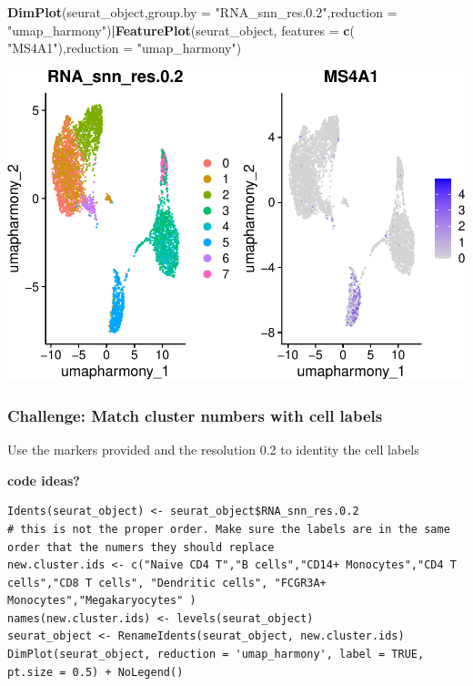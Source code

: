 \documentclass[
]{book}
\newenvironment{Shaded}{\begin{snugshade}}{\end{snugshade}}
\newcommand{\AttributeTok}[1]{\textcolor[rgb]{0.13,0.29,0.53}{#1}}
\newcommand{\FunctionTok}[1]{\textcolor[rgb]{0.13,0.29,0.53}{\textbf{#1}}}
\newcommand{\NormalTok}[1]{#1}
\newcommand{\SpecialCharTok}[1]{\textcolor[rgb]{0.81,0.36,0.00}{\textbf{#1}}}
\newcommand{\StringTok}[1]{\textcolor[rgb]{0.31,0.60,0.02}{#1}}
\begin{document}
\begin{Shaded}
\begin{Highlighting}[]


\FunctionTok{DimPlot}\NormalTok{(seurat\_object,}\AttributeTok{group.by =} \StringTok{"RNA\_snn\_res.0.2"}\NormalTok{,}\AttributeTok{reduction =} \StringTok{"umap\_harmony"}\NormalTok{)}\SpecialCharTok{|}\FunctionTok{FeaturePlot}\NormalTok{(seurat\_object, }\AttributeTok{features =} \FunctionTok{c}\NormalTok{( }\StringTok{"MS4A1"}\NormalTok{),}\AttributeTok{reduction =} \StringTok{"umap\_harmony"}\NormalTok{)}
\end{Highlighting}
\end{Shaded}

\includegraphics{scRNAseqInR_ABACBS_2024_Doco_files/figure-latex/labelplot-1.pdf}

\hypertarget{challenge-match-cluster-numbers-with-cell-labels}{%
\subsubsection*{Challenge: Match cluster numbers with cell labels}\label{challenge-match-cluster-numbers-with-cell-labels}}

Use the markers provided and the resolution 0.2 to identity the cell labels

\textbf{code ideas?}

\begin{verbatim}
Idents(seurat_object) <- seurat_object$RNA_snn_res.0.2
# this is not the proper order. Make sure the labels are in the same order that the numers they should replace
new.cluster.ids <- c("Naive CD4 T","B cells","CD14+ Monocytes","CD4 T cells","CD8 T cells", "Dendritic cells", "FCGR3A+ Monocytes","Megakaryocytes" )
names(new.cluster.ids) <- levels(seurat_object)
seurat_object <- RenameIdents(seurat_object, new.cluster.ids)
DimPlot(seurat_object, reduction = 'umap_harmony', label = TRUE, pt.size = 0.5) + NoLegend()
\end{verbatim}
\end{document}
